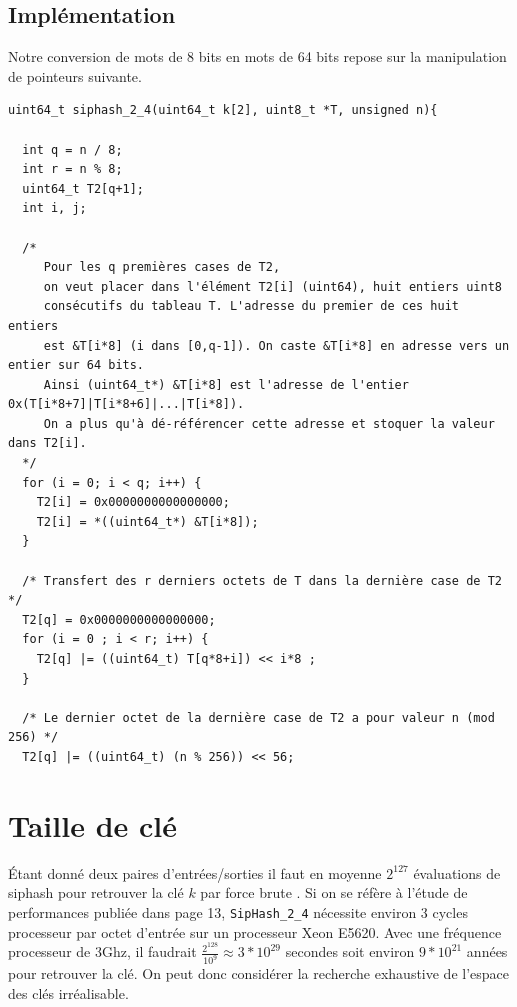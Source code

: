 \documentclass[11pt]{article}
\theoremstyle{definition}
\theoremstyle{definition}
\theoremstyle{definition}
\theoremstyle{theorem}
\theoremstyle{definition}
\begin{document}
\subsection{Implémentation}
Notre conversion de mots de 8 bits en mots de 64 bits repose sur la manipulation de
pointeurs suivante.
\begin{verbatim}
uint64_t siphash_2_4(uint64_t k[2], uint8_t *T, unsigned n){

  int q = n / 8;
  int r = n % 8;
  uint64_t T2[q+1];
  int i, j;

  /*
     Pour les q premières cases de T2,
     on veut placer dans l'élément T2[i] (uint64), huit entiers uint8
     consécutifs du tableau T. L'adresse du premier de ces huit entiers
     est &T[i*8] (i dans [0,q-1]). On caste &T[i*8] en adresse vers un entier sur 64 bits.
     Ainsi (uint64_t*) &T[i*8] est l'adresse de l'entier 0x(T[i*8+7]|T[i*8+6]|...|T[i*8]).
     On a plus qu'à dé-référencer cette adresse et stoquer la valeur dans T2[i].
  */
  for (i = 0; i < q; i++) {
    T2[i] = 0x0000000000000000;
    T2[i] = *((uint64_t*) &T[i*8]);
  }

  /* Transfert des r derniers octets de T dans la dernière case de T2 */
  T2[q] = 0x0000000000000000;
  for (i = 0 ; i < r; i++) {
    T2[q] |= ((uint64_t) T[q*8+i]) << i*8 ;
  }

  /* Le dernier octet de la dernière case de T2 a pour valeur n (mod 256) */
  T2[q] |= ((uint64_t) (n % 256)) << 56;
\end{verbatim}

\section{Taille de clé}
Étant donné deux paires d'entrées/sorties il faut en moyenne $2^{127}$ évaluations de siphash pour
retrouver la clé $k$ par force brute \cite{AB12}.
Si on se réfère à l'étude de performances publiée dans \cite{AB12} page 13, \texttt{SipHash\_2\_4} nécessite
environ 3 cycles processeur par octet d'entrée sur un processeur Xeon E5620. Avec une fréquence processeur de 3Ghz,
il faudrait $\frac{2^{128}}{10^9} \approx 3 * 10^{29}$ secondes soit environ $9*10^{21}$ années pour retrouver la clé. 
On peut donc considérer la recherche exhaustive de l'espace des clés irréalisable.
\end{document}
